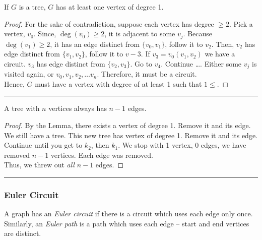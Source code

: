 \documentclass{article}
\def \proofDistance {5pt}
\newcommand{\proofseparator}{\par\noindent\rule{\textwidth}{0.4pt}}
\newcommand{\pf}[1]{
    \vspace{\proofDistance}
    \begin{proof}
    #1
    \end{proof}
    \proofseparator
}
\begin{document}
            \vspace{0.5cm}

            \begin{lemma}
                If $G$ is a tree, $G$ has at least one vertex of degree 1. 
            \end{lemma}

            \pf{
                For the sake of contradiction, suppose each vertex has degree $\geq 2$. Pick a vertex, $v_0$. Since, $\deg(v_0) \geq 2$, it is adjacent to some $v_j$. Because $\deg(v_1) \geq 2$, it has an edge distinct from $\{v_0,v_1\}$, follow it to $v_2$. Then, $v_2$ has edge distinct from $\{v_1,v_2\}$, follow it to $v-3$. If $v_3=v_0 (v_1,v_2)$ we have a circuit. $v_3$ has edge distinct from $\{v_2,v_3\}$. Go to $v_4$. Continue \dots. Either some $v_j$ is visited again, or $v_0,v_1,v_2,\dots v_n$. Therefore, it must be a circuit. \\

                Hence, $G$ must have a vertex with degree of at least 1 such that $1\leq$.
            }

\setcounter{theorem}{0}
            
            \begin{theorem}
                A tree with $n$ vertices always has $n-1$ edges.
            \end{theorem}

            \pf{
                By the Lemma, there exists a vertex of degree 1. Remove it and its edge. We still have a tree. This new tree has vertex of degree 1. Remove it and its edge. Continue until you get to $k_2$, then $k_1$. We stop with 1 vertex, 0 edges, we have removed $n-1$ vertices. Each edge was removed. \\

                Thus, we threw out \textit{all} $n-1$ edges.
            }



            

\newpage

        \subsubsection{Euler Circuit}

            \begin{definition}
                A graph has an \textit{Euler circuit} if there is a circuit which uses each edge only once. Similarly, an \textit{Euler path} is a path which uses each edge -- start and end vertices are distinct.
            \end{definition}
    
\end{document}
